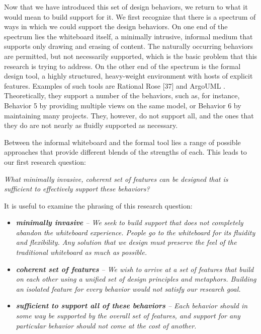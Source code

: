 Now that we have introduced this set of design behaviors, we return to what it would mean to build support for it. We first recognize that there is a spectrum of ways in which we could support the design behaviors. On one end of the spectrum lies the whiteboard itself, a minimally intrusive, informal medium that supports only drawing and erasing of content. The naturally occurring behaviors are permitted, but not necessarily supported, which is the basic problem that this research is trying to address. On the other end of the spectrum is the formal design tool, a highly structured, heavy-weight environment with hosts of explicit features. Examples of such tools are Rational Rose [37] and ArgoUML \cite{robbins2000cognitive}. Theoretically, they support a number of the behaviors, such as, for instance, Behavior 5 by providing multiple views on the same model, or Behavior 6 by maintaining many projects. They, however, do not support all, and the ones that they do are not nearly as fluidly supported as necessary. 

Between the informal whiteboard and the formal tool lies a range of possible approaches that provide different blends of the strengths of each. This leads to our first research question:

    \newenvironment{myindentpar}[1]%
     {\begin{list}{}%
             {\setlength{\leftmargin}{#1}}%
             \item[]%
     }
     {\end{list}}

\begin{myindentpar}{1cm}
\emph{What minimally invasive, coherent set of features can be designed that is sufficient to effectively support these behaviors?}
\end{myindentpar}


It is useful to examine the phrasing of this research question:

\begin{itemize}

\item \emph{\textbf{minimally invasive} -- We seek to build support that does not completely abandon the whiteboard experience. People go to the whiteboard for its fluidity and flexibility. Any solution that we design must preserve the feel of the traditional whiteboard as much as possible.}

\item \emph{\textbf{coherent set of features} -- We wish to arrive at a set of features that build on each other using a unified set of design principles and metaphors. Building an isolated feature for every behavior would not satisfy our research goal.}

\item \emph{\textbf{sufficient to support all of these behaviors} -- Each behavior should in some way be supported by the overall set of features, and support for any particular behavior should not come at the cost of another. }
\end{itemize}

